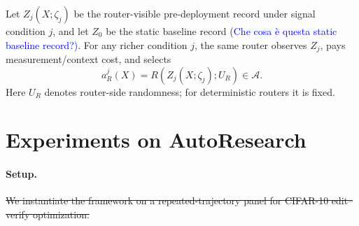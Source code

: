 \documentclass{article}
\newcommand{\cA}{\mathcal{A}}
\newcommand{\E}{\mathbb{E}}
\newcommand{\J}{\mathcal{J}}
\begin{document}
Let \(Z_j(X;\zeta_j)\) be the router-visible pre-deployment record under signal condition
\(j\), and let \(Z_0\) be the static baseline record (\textcolor{blue}{Che cosa è questa static baseline record?)}.  For any richer condition \(j\), the same
router observes \(Z_j\), pays measurement/context cost, and selects
\[
    a_R^j(X)=R(Z_j(X;\zeta_j);U_R)\in\cA .
\]
Here \(U_R\) denotes router-side randomness; for deterministic routers it is fixed.



\section{Experiments on AutoResearch}
\label{sec:experiments}

\paragraph{Setup.}
\sout{We instantiate the framework on a repeated-trajectory panel for CIFAR-10 edit--verify optimization.}
\end{document}
